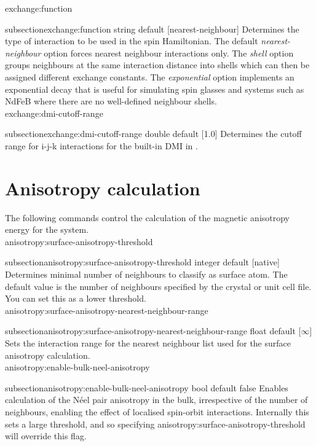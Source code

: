 {\zicf exchange:function}
{subsection}{exchange:function string default [nearest-neighbour]}
  Determines the type of interaction to be used in the spin Hamiltonian. The
  default \textit{nearest-neighbour} option forces nearest neighbour
  interactions only. The \textit{shell} option groups neighbours at the same
  interaction distance into shells which can then be assigned different exchange
  constants. The \textit{exponential} option implements an exponential decay
  that is useful for simulating spin glasses and systems such as NdFeB where
  there are no well-defined neighbour shells.\\

{\zicf exchange:dmi-cutoff-range}
{subsection}{exchange:dmi-cutoff-range double default [1.0]}
  Determines the cutoff range for i-j-k interactions for the built-in DMI in \vampire.


\section*{Anisotropy calculation}
The following commands control the calculation of the magnetic anisotropy energy for the system.\\

{\zicf anisotropy:surface-anisotropy-threshold}
{subsection}{anisotropy:surface-anisotropy-threshold}
  integer default [native]
  Determines minimal number of neighbours to classify as surface atom. The
  default value is the number of neighbours specified by the crystal or unit cell
  file. You can set this as a lower threshold. \\

{\zicf anisotropy:surface-anisotropy-nearest-neighbour-range}
{subsection}{anisotropy:surface-anisotropy-nearest-neighbour-range}
  float default [$\infty$]
  Sets the interaction range for the nearest neighbour list used for the surface
  anisotropy calculation.\\

{\zicf anisotropy:enable-bulk-neel-anisotropy}
{subsection}{anisotropy:enable-bulk-neel-anisotropy}
  bool default false
  Enables calculation of the N\'eel pair anisotropy in the bulk, irrespective of
  the number of neighbours, enabling the effect of localised spin-orbit
  interactions. Internally this sets a large threshold, and so specifying
  anisotropy:surface-anisotropy-threshold will override this flag.\\

